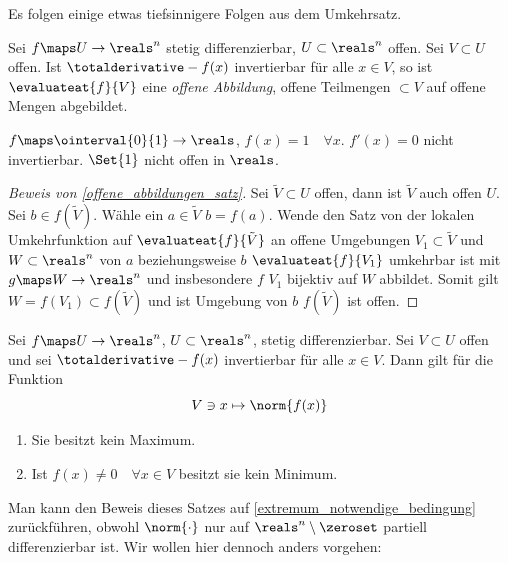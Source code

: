Es folgen einige etwas tiefsinnigere Folgen aus dem Umkehrsatz.
\begin{satz}\label{offene_abbildungen_satz}
  Sei \( f\maps U\to \reals^n \) stetig differenzierbar, \( U\subset \reals^n \) offen. Sei \( V\subset U \) offen. Ist \( \totalderivative-{f}(x) \) invertierbar für alle \( x\in V \), so ist \( \evaluateat{f}{V} \) eine \emph{offene Abbildung}, \dh offene Teilmengen \( \subset V \) auf offene Mengen abgebildet.
\end{satz}
\begin{antibeispiel*}
  \( f\maps \ointerval{0}{1}\to \reals \), \( f(x)=1\quad \forall x \). \( f'(x)=0 \) nicht invertierbar. \( \Set{1} \) nicht offen in \( \reals \).
\end{antibeispiel*}
\begin{proof}[Beweis von \ref{offene_abbildungen_satz}]
  Sei \( \tilde{V}\subset U \) offen, dann ist \( \tilde{V}  \) auch offen \( U \). Sei \( b\in f(\tilde{V}) \). Wähle ein \( a\in \tilde{V} \) \sd \( b=f(a) \). Wende den Satz von der lokalen Umkehrfunktion auf \( \evaluateat{f}{\tilde{V}} \) an \timplies \texists  offene Umgebungen \( V_1\subset \tilde{V} \) und \( W\subset \reals^n \) von \( a \) beziehungsweise \( b \) \sd \( \evaluateat{f}{V_1} \) umkehrbar ist mit \( g\maps W\to \reals^n \) und insbesondere \( f \) \( V_1 \) bijektiv auf \( W \) abbildet. Somit gilt \( W=f(V_1)\subset f(\tilde{V}) \) und ist Umgebung von \( b \) \timplies \( f(\tilde{V}) \) ist offen.
\end{proof}
\begin{satz}\label{extremumprinzip}
  Sei \( f\maps U\to \reals^n \), \( U\subset \reals^n \), stetig differenzierbar. Sei \( V\subset U \) offen und sei \( \totalderivative-{f}(x) \) invertierbar für alle \( x\in V \). Dann gilt für die Funktion
  \begin{equation*}
    V\ni x\mapsto \norm{f(x)}
  \end{equation*}
  \begin{enumerate}
    \item \label{extremumprinzip:kein_maximum} Sie besitzt kein Maximum.
    \item \label{extremumprinzip:kein_minimum_wenn_nicht_null} Ist \( f(x)\neq 0\quad \forall x\in V \) besitzt sie kein Minimum.
  \end{enumerate}
\end{satz}
\begin{beachte*}
  Man kann den Beweis dieses Satzes auf \ref{extremum_notwendige_bedingung} zurückführen, obwohl \( \norm{\cdot} \) nur auf \( \reals^n\setminus \zeroset  \) partiell differenzierbar ist. Wir wollen hier dennoch anders vorgehen:
\end{beachte*}
